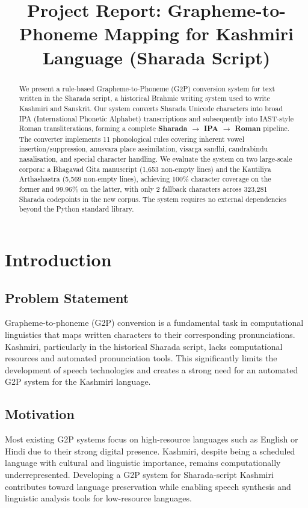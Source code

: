 \documentclass[11pt]{article}
\title{Project Report: Grapheme-to-Phoneme Mapping for Kashmiri Language (Sharada Script)}
\begin{document}
\maketitle

\begin{abstract}
We present a rule-based Grapheme-to-Phoneme (G2P) conversion system for text written in the Sharada script, a historical Brahmic writing system used to write Kashmiri and Sanskrit. Our system converts Sharada Unicode characters into broad IPA (International Phonetic Alphabet) transcriptions and subsequently into IAST-style Roman transliterations, forming a complete \textbf{Sharada $\rightarrow$ IPA $\rightarrow$ Roman} pipeline. The converter implements 11 phonological rules covering inherent vowel insertion/suppression, anusvara place assimilation, visarga sandhi, candrabindu nasalisation, and special character handling. We evaluate the system on two large-scale corpora: a Bhagavad Gita manuscript (1,653 non-empty lines) and the Kautiliya Arthashastra (5,569 non-empty lines), achieving 100\% character coverage on the former and 99.96\% on the latter, with only 2 fallback characters across 323,281 Sharada codepoints in the new corpus. The system requires no external dependencies beyond the Python standard library.
\end{abstract}

\section{Introduction}

\subsection{Problem Statement}
Grapheme-to-phoneme (G2P) conversion is a fundamental task in computational linguistics that maps written characters to their corresponding pronunciations. Kashmiri, particularly in the historical Sharada script, lacks computational resources and automated pronunciation tools. This significantly limits the development of speech technologies and creates a strong need for an automated G2P system for the Kashmiri language.

\subsection{Motivation}
Most existing G2P systems focus on high-resource languages such as English or Hindi due to their strong digital presence. Kashmiri, despite being a scheduled language with cultural and linguistic importance, remains computationally underrepresented. Developing a G2P system for Sharada-script Kashmiri contributes toward language preservation while enabling speech synthesis and linguistic analysis tools for low-resource languages.
\end{document}
